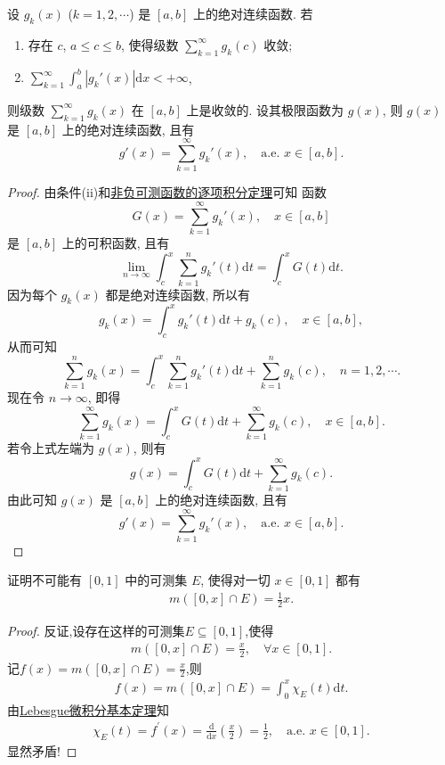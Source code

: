 \documentclass[../../main.tex]{subfiles}%
\begin{document}
\begin{proposition}
设 $g_k(x)$ ($k=1,2,\cdots$) 是 $[a,b]$ 上的绝对连续函数. 若
\begin{enumerate}[(1)]
\item 存在 $c$, $a\leqslant c\leqslant b$, 使得级数 $\sum_{k=1}^\infty g_k(c)$ 收敛;
\item $\sum_{k=1}^\infty \int_a^b |g_k'(x)|\mathrm{d}x < +\infty$,
\end{enumerate}
则级数 $\sum_{k=1}^\infty g_k(x)$ 在 $[a,b]$ 上是收敛的. 设其极限函数为 $g(x)$, 则 $g(x)$ 是 $[a,b]$ 上的绝对连续函数, 且有
\[
g'(x) = \sum_{k=1}^\infty g_k'(x),\quad \text{a.e. } x\in[a,b].
\]
\end{proposition}
\begin{proof}
由条件(ii)和\hyperref[theorem:非负可测函数的逐项积分定理]{非负可测函数的逐项积分定理}可知 函数
\[
G(x) = \sum_{k=1}^\infty g_k'(x),\quad x\in[a,b]
\]
是 $[a,b]$ 上的可积函数, 且有
\[
\lim_{n\to\infty} \int_c^x \sum_{k=1}^n g_k'(t)\mathrm{d}t = \int_c^x G(t)\mathrm{d}t.
\]
因为每个 $g_k(x)$ 都是绝对连续函数, 所以有
\[
g_k(x) = \int_c^x g_k'(t)\mathrm{d}t + g_k(c),\quad x\in[a,b],
\]
从而可知
\[
\sum_{k=1}^n g_k(x) = \int_c^x \sum_{k=1}^n g_k'(t)\mathrm{d}t + \sum_{k=1}^n g_k(c),\quad n=1,2,\cdots.
\]
现在令 $n\to\infty$, 即得
\[
\sum_{k=1}^\infty g_k(x) = \int_c^x G(t)\mathrm{d}t + \sum_{k=1}^\infty g_k(c),\quad x\in[a,b].
\]
若令上式左端为 $g(x)$, 则有
\[
g(x) = \int_c^x G(t)\mathrm{d}t + \sum_{k=1}^\infty g_k(c).
\]
由此可知 $g(x)$ 是 $[a,b]$ 上的绝对连续函数, 且有
\[
g'(x) = \sum_{k=1}^\infty g_k'(x),\quad \text{a.e. } x\in[a,b].
\]
\end{proof}

\begin{example}
证明不可能有 $[0,1]$ 中的可测集 $E$, 使得对一切 $x\in[0,1]$ 都有
\begin{align*}
m([0,x]\cap E)=\frac{1}{2}x.
\end{align*}
\end{example}
\begin{proof}
反证,设存在这样的可测集$E\subseteq [0,1]$,使得
\begin{align*}
m\left( [0,x] \cap E \right) =\frac{x}{2},\quad \forall x\in [0,1].
\end{align*}
记$f\left( x \right) =m\left( [0,x] \cap E \right) =\frac{x}{2}$,则
\begin{align*}
f\left( x \right) =m\left( [0,x] \cap E \right) =\int_0^x{\chi _E\left( t \right) \mathrm{d}t}.
\end{align*}
由\hyperref[corollary:Lebesgue积分基本定理]{Lebesgue微积分基本定理}知
\begin{align*}
\chi _E\left( t \right) =f^\prime \left( x \right) =\frac{\mathrm{d}}{\mathrm{d}x}\left( \frac{x}{2} \right) =\frac{1}{2},\quad \mathrm{a}.\mathrm{e}.\,\,x\in [0,1].
\end{align*}
显然矛盾!
\end{proof}
\end{document}

